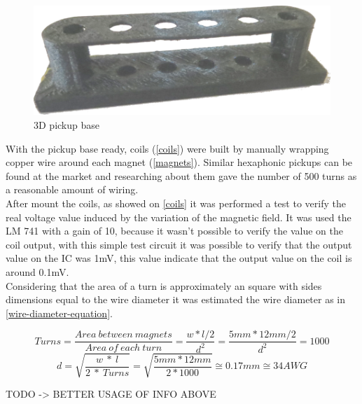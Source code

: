 \begin{figure}[!htpb]
\centering
\caption{3D pickup base}
\label{3D-base}
\includegraphics[scale=0.08]{images/base}
\end{figure}

With the pickup base ready, coils (\autoref{coils}) were built by manually wrapping copper wire around
each magnet (\autoref{magnets}). Similar hexaphonic pickups can be found at the
market and researching about them gave the number of 500 turns as a reasonable amount
of wiring. \\

After mount the coils, as showed on \autoref{coils} it was performed a test to verify the real voltage value induced by
the variation of the magnetic field. It was used the LM 741 \cite{LM741} with a gain of 10,
because it wasn't possible to verify the value on the coil output, with this simple test circuit
it was possible to verify that the output value on the IC was 1mV, this value indicate that the
output value on the coil is around 0.1mV. \\
Considering that the area of a turn is approximately an square with sides dimensions
equal to the wire diameter it was estimated the wire diameter as in \autoref{wire-diameter-equation}.

\begin{equation}
  \label{turns-equation}
  Turns = \frac{Area\ between\ magnets}{Area\ of\ each\ turn} = \frac{ w * l / 2 }{ d^{2} } = \frac{5mm * 12mm / 2}{d^2} = 1000
\end{equation}
\begin{equation}
  \label{wire-diameter-equation}
  d = \sqrt{\frac{w\ *\ l}{2\ *\ Turns}} = \sqrt{\frac{5mm * 12mm}{2*1000}} \cong 0.17mm \cong 34AWG
\end{equation}

TODO -> BETTER USAGE OF INFO ABOVE\\


